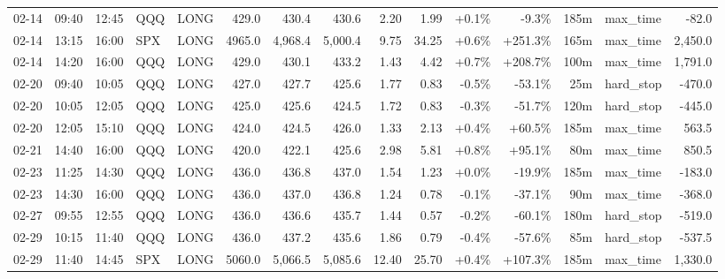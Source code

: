 \documentclass[11pt,a4paper,twoside]{article}
\begin{document}
\begin{landscape}
\begin{center}
\begin{longtable}{>{\color{txtmain}}l l l l l r r r r r r r r >{\color{txtmain}}l r}
02-14 & 09:40 & 12:45 & QQQ & LONG & 429.0 & 430.4 & 430.6 & 2.20 & 1.99 & \textcolor{wingreen}{+0.1\%} & \textcolor{lossred}{-9.3\%} & 185m & max\_time & \textcolor{lossred}{-82.0} \\
02-14 & 13:15 & 16:00 & SPX & LONG & 4965.0 & 4,968.4 & 5,000.4 & 9.75 & 34.25 & \textcolor{wingreen}{+0.6\%} & \textcolor{wingreen}{+251.3\%} & 165m & max\_time & \textcolor{wingreen}{2,450.0} \\
02-14 & 14:20 & 16:00 & QQQ & LONG & 429.0 & 430.1 & 433.2 & 1.43 & 4.42 & \textcolor{wingreen}{+0.7\%} & \textcolor{wingreen}{+208.7\%} & 100m & max\_time & \textcolor{wingreen}{1,791.0} \\
02-20 & 09:40 & 10:05 & QQQ & LONG & 427.0 & 427.7 & 425.6 & 1.77 & 0.83 & \textcolor{lossred}{-0.5\%} & \textcolor{lossred}{-53.1\%} & 25m & hard\_stop & \textcolor{lossred}{-470.0} \\
02-20 & 10:05 & 12:05 & QQQ & LONG & 425.0 & 425.6 & 424.5 & 1.72 & 0.83 & \textcolor{lossred}{-0.3\%} & \textcolor{lossred}{-51.7\%} & 120m & hard\_stop & \textcolor{lossred}{-445.0} \\
02-20 & 12:05 & 15:10 & QQQ & LONG & 424.0 & 424.5 & 426.0 & 1.33 & 2.13 & \textcolor{wingreen}{+0.4\%} & \textcolor{wingreen}{+60.5\%} & 185m & max\_time & \textcolor{wingreen}{563.5} \\
02-21 & 14:40 & 16:00 & QQQ & LONG & 420.0 & 422.1 & 425.6 & 2.98 & 5.81 & \textcolor{wingreen}{+0.8\%} & \textcolor{wingreen}{+95.1\%} & 80m & max\_time & \textcolor{wingreen}{850.5} \\
02-23 & 11:25 & 14:30 & QQQ & LONG & 436.0 & 436.8 & 437.0 & 1.54 & 1.23 & \textcolor{wingreen}{+0.0\%} & \textcolor{lossred}{-19.9\%} & 185m & max\_time & \textcolor{lossred}{-183.0} \\
02-23 & 14:30 & 16:00 & QQQ & LONG & 436.0 & 437.0 & 436.8 & 1.24 & 0.78 & \textcolor{lossred}{-0.1\%} & \textcolor{lossred}{-37.1\%} & 90m & max\_time & \textcolor{lossred}{-368.0} \\
02-27 & 09:55 & 12:55 & QQQ & LONG & 436.0 & 436.6 & 435.7 & 1.44 & 0.57 & \textcolor{lossred}{-0.2\%} & \textcolor{lossred}{-60.1\%} & 180m & hard\_stop & \textcolor{lossred}{-519.0} \\
02-29 & 10:15 & 11:40 & QQQ & LONG & 436.0 & 437.2 & 435.6 & 1.86 & 0.79 & \textcolor{lossred}{-0.4\%} & \textcolor{lossred}{-57.6\%} & 85m & hard\_stop & \textcolor{lossred}{-537.5} \\
02-29 & 11:40 & 14:45 & SPX & LONG & 5060.0 & 5,066.5 & 5,085.6 & 12.40 & 25.70 & \textcolor{wingreen}{+0.4\%} & \textcolor{wingreen}{+107.3\%} & 185m & max\_time & \textcolor{wingreen}{1,330.0} \\

\end{longtable}
\end{center}
\end{landscape}
\end{document}
